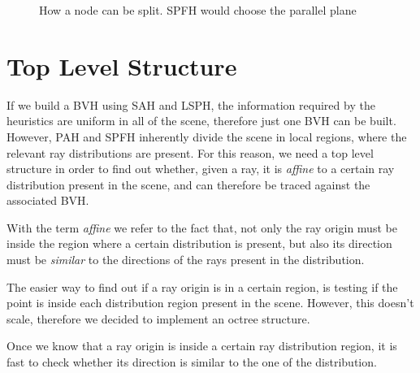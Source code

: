 \documentclass{PoliMi_MasterThesis}
\begin{document}
\begin{figure}[H]
{    }
	\caption{How a node can be split. SPFH would choose the parallel plane}
    \label{fig:nodes_splitting_intro}
\end{figure}

\section*{Top Level Structure}
If we build a BVH using SAH and LSPH, the information required by the heuristics are uniform in all of the scene, therefore just one BVH can be built. However, PAH and SPFH inherently divide the scene in local regions, where the relevant ray distributions are present. For this reason, we need a top level structure in order to find out whether, given a ray, it is \textit{affine} to a certain ray distribution present in the scene, and can therefore be traced against the associated BVH.

With the term \textit{affine} we refer to the fact that, not only the ray origin must be inside the region where a certain distribution is present, but also its direction must be \textit{similar} to the directions of the rays present in the distribution.

The easier way to find out if a ray origin is in a certain region, is testing if the point is inside each distribution region present in the scene. However, this doesn't scale, therefore we decided to implement an octree structure. 

Once we know that a ray origin is inside a certain ray distribution region, it is fast to check whether its direction is similar to the one of the distribution.
\end{document}

